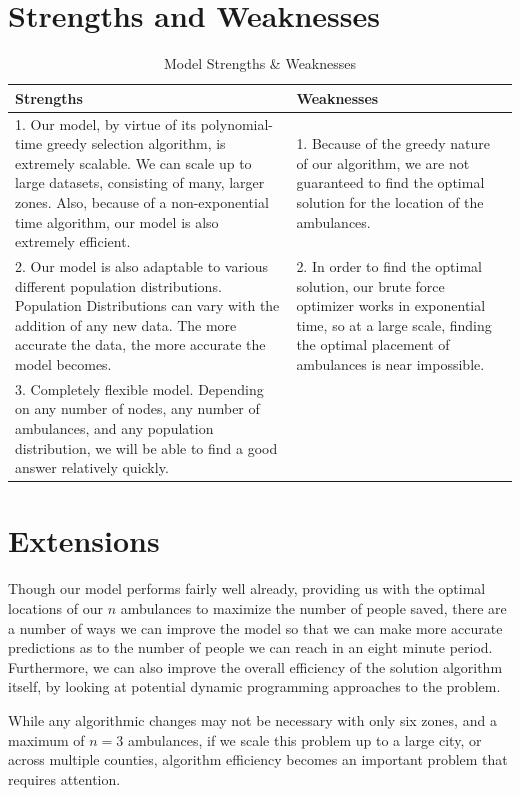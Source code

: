 \documentclass[notitlepage, 12pt]{article}
\begin{document}
\section{Strengths and Weaknesses}

\begin{table}[H]
    \centering
    \begin{tabular}{ p{6.25cm}|p{6.25cm} }
        \textbf{Strengths} & \textbf{Weaknesses}\\
        \hline
        1. Our model, by virtue of its polynomial-time greedy selection algorithm, is extremely scalable. We can scale up to large datasets, consisting of many, larger zones. Also, because of a non-exponential time algorithm, our model is also extremely efficient. & 1. Because of the greedy nature of our algorithm, we are not guaranteed to find the optimal solution for the location of the ambulances.\\
        2. Our model is also adaptable to various different population distributions. Population Distributions can vary with the addition of any new data. The more accurate the data, the more accurate the model becomes. & 2. In order to find the optimal solution, our brute force optimizer works in exponential time, so at a large scale, finding the optimal placement of ambulances is near impossible. \\
        3. Completely flexible model. Depending on any number of nodes, any number of ambulances, and any population distribution, we will be able to find a good answer relatively quickly.

    \end{tabular}
    \caption{Model Strengths \& Weaknesses}
    \label{tab:modelprocons}
\end{table}


\section{Extensions}
Though our model performs fairly well already, providing us with the optimal locations of our $n$ ambulances to
maximize the number of people saved, there are a number of ways we can improve the model so that we can make more
accurate predictions as to the number of people we can reach in an eight minute period. Furthermore, we can also
improve the overall efficiency of the solution algorithm itself, by looking at potential dynamic programming approaches to the problem.

While any algorithmic changes may not be necessary with only six zones, and a maximum of $n = 3$ ambulances, if
we scale this problem up to a large city, or across multiple counties, algorithm efficiency becomes an important problem that requires attention.
\end{document}
